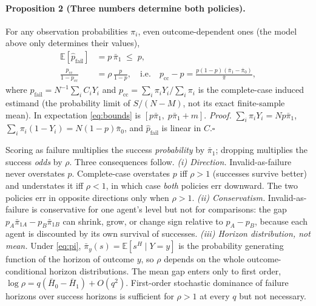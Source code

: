 \documentclass[letterpaper]{article} %
\newcommand{\pb}{\bar\pi}
\begin{document}
\paragraph{Proposition 2 (Three numbers determine both policies).}
For any observation probabilities $\pi_i$, even outcome-dependent ones (the
model above only determines their values),
\begin{align}
\mathbb{E}[\hat p_{\mathrm{fail}}] &= p\,\pb_1 \;\le\; p, \label{eq:fail}\\
\frac{p_{\mathrm{cc}}}{1-p_{\mathrm{cc}}} &= \rho\,\frac{p}{1-p},
\quad\text{i.e.}\quad
p_{\mathrm{cc}}-p=\frac{p(1-p)(\pb_1-\pb_0)}{\pb}, \label{eq:cc}
\end{align}
where $\hat p_{\mathrm{fail}}=N^{-1}\sum_iC_iY_i$ and $p_{\mathrm{cc}}=\sum_i
\pi_iY_i/\sum_i\pi_i$ is the complete-case induced estimand (the probability
limit of $S/(N-M)$, not its exact finite-sample mean). In expectation
\eqref{eq:bounds} is $[p\pb_1,\;p\pb_1+m]$.
\emph{Proof.} $\sum_i\pi_iY_i=Np\pb_1$, $\sum_i\pi_i(1-Y_i)=N(1-p)\pb_0$, and
$\hat p_{\mathrm{fail}}$ is linear in $C$.\hfill$\square$

Scoring as failure multiplies the success \emph{probability} by $\pb_1$; dropping
multiplies the success \emph{odds} by $\rho$. Three consequences follow.
\emph{(i) Direction.} Invalid-as-failure never overstates $p$. Complete-case
overstates $p$ iff $\rho>1$ (successes survive better) and understates it iff
$\rho<1$, in which case \emph{both} policies err downward. The two policies err
in opposite directions only when $\rho>1$.
\emph{(ii) Conservatism.} Invalid-as-failure is conservative for one agent's
level but not for comparisons: the gap $p_A\pb_{1A}-p_B\pb_{1B}$ can shrink,
grow, or change sign relative to $p_A-p_B$, because each agent is discounted by
its own survival of successes.
\emph{(iii) Horizon distribution, not mean.} Under \eqref{eq:pi},
$\pb_y(s)=\mathbb{E}[s^H\mid Y=y]$ is the probability generating function of
the horizon of outcome $y$, so $\rho$ depends on the whole outcome-conditional
horizon distributions. The mean gap enters only to first order,
$\log\rho=q(\bar H_0-\bar H_1)+O(q^2)$. First-order stochastic dominance of
failure horizons over success horizons is sufficient for $\rho>1$ at every $q$
but not necessary.
\end{document}
